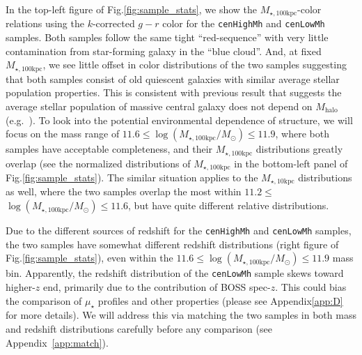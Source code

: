\documentclass{emulateapj}
\def\rbcg{\texttt{cenHighMh}}
\def\nbcg{\texttt{cenLowMh}}
\def\mhalo{{$M_{\mathrm{halo}}$}}
\def\minn{{$M_{\star,10\mathrm{kpc}}$}}
\def\mtot{{$M_{\star,100\mathrm{kpc}}$}}
\def\logmtot{{$\log (M_{\star,100\mathrm{kpc}}/M_{\odot})$}}
\def\mden{{$\mu_{\star}$}}
\begin{document}
\begin{CJK*}{UTF8}{gbsn}
    In the top-left figure of Fig.\ref{fig:sample_stats}, we show the \mtot{}-color 
    relations using the $k$-corrected $g-r$ color for the \rbcg{} and \nbcg{} 
    samples. 
    Both samples follow the same tight ``red-sequence'' with very little contamination 
    from star-forming galaxy in the ``blue cloud''.
    And, at fixed \mtot{}, we see little offset in color distributions of the two 
    samples suggesting that both samples consist of old quiescent galaxies with 
    similar average stellar population properties.  
    This is consistent with previous result that suggests the average stellar 
    population of massive central galaxy does not depend on \mhalo{} 
    (e.g.\ \citealt{Park2007}).  
    To look into the potential environmental dependence of structure, we will 
    focus on the mass range of $11.6 \le$\logmtot{}$\le 11.9$, where both samples 
    have acceptable completeness, and their \mtot{} distributions greatly overlap
    (see the normalized distributions of \mtot{} in the bottom-left panel of 
    Fig.\ref{fig:sample_stats}). 
    The similar situation applies to the \minn{} distributions as well, where 
    the two samples overlap the most within $11.2 \le$\logmtot{}$\le 11.6$, but 
    have quite different relative distributions.
    
    Due to the different sources of redshift for the \rbcg{} and \nbcg{} samples, 
    the two samples have somewhat different redshift distributions 
    (right figure of Fig.\ref{fig:sample_stats}), even within the 
    $11.6 \le$\logmtot{}$\le 11.9$ mass bin.  
    Apparently, the redshift distribution of the \nbcg{} sample skews toward 
    higher-$z$ end, primarily due to the contribution of BOSS spec-$z$.
    This could bias the comparison of \mden{} profiles and other properties 
    (please see Appendix\ref{app:D} for more details).  
    We will address this via matching the two samples in both mass and redshift
    distributions carefully before any comparison (see Appendix~\ref{app:match}).
    

\end{CJK*}
\end{document}
